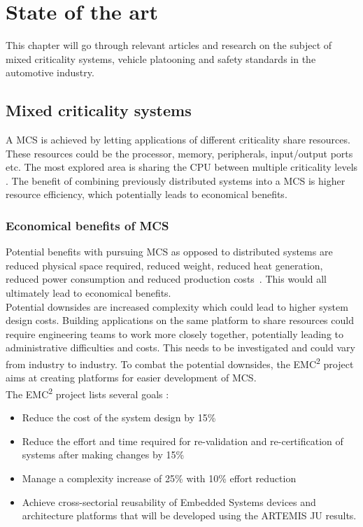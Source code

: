 \chapter{State of the art}
\label{sec:sota}
This chapter will go through relevant articles and research on the subject of mixed criticality systems, vehicle platooning and safety standards in the automotive industry.

\section{Mixed criticality systems}
A MCS is achieved by letting applications of different criticality share resources. These resources could be the processor, memory, peripherals, input/output ports etc. The most explored area is sharing the CPU between multiple criticality levels \cite{burns2016}. The benefit of combining previously distributed systems into a MCS is higher resource efficiency, which potentially leads to economical benefits.


\subsection{Economical benefits of MCS}
Potential benefits with pursuing MCS as opposed to distributed systems are reduced physical space required, reduced weight, reduced heat generation, reduced power consumption and reduced production costs~\cite{burns2016}. This would all ultimately lead to economical benefits.\\

Potential downsides are increased complexity which could lead to higher system design costs. Building applications on the same platform to share resources could require engineering teams to work more closely together, potentially leading to administrative difficulties and costs. This needs to be investigated and could vary from industry to industry. To combat the potential downsides, the EMC\textsuperscript{2} project aims at creating platforms for easier development of MCS.\\ %

The EMC\textsuperscript{2} project lists several goals \cite{website:emc2goals}:
\begin{itemize}
\item Reduce the cost of the system design by 15\%
\item Reduce the effort and time required for re-validation and re-certification of systems after making changes by 15\%
\item Manage a complexity increase of 25\% with 10\% effort reduction
\item Achieve cross-sectorial reusability of Embedded Systems devices and architecture platforms that will be developed using the ARTEMIS JU results.
\end{itemize}

